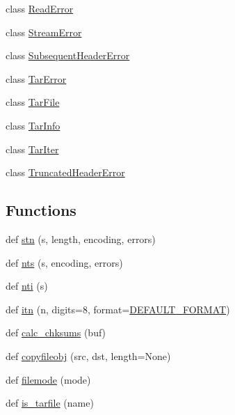 \begin{DoxyCompactItemize}
\item 
class \hyperlink{classpip_1_1__vendor_1_1distlib_1_1__backport_1_1tarfile_1_1ReadError}{Read\+Error}
\item 
class \hyperlink{classpip_1_1__vendor_1_1distlib_1_1__backport_1_1tarfile_1_1StreamError}{Stream\+Error}
\item 
class \hyperlink{classpip_1_1__vendor_1_1distlib_1_1__backport_1_1tarfile_1_1SubsequentHeaderError}{Subsequent\+Header\+Error}
\item 
class \hyperlink{classpip_1_1__vendor_1_1distlib_1_1__backport_1_1tarfile_1_1TarError}{Tar\+Error}
\item 
class \hyperlink{classpip_1_1__vendor_1_1distlib_1_1__backport_1_1tarfile_1_1TarFile}{Tar\+File}
\item 
class \hyperlink{classpip_1_1__vendor_1_1distlib_1_1__backport_1_1tarfile_1_1TarInfo}{Tar\+Info}
\item 
class \hyperlink{classpip_1_1__vendor_1_1distlib_1_1__backport_1_1tarfile_1_1TarIter}{Tar\+Iter}
\item 
class \hyperlink{classpip_1_1__vendor_1_1distlib_1_1__backport_1_1tarfile_1_1TruncatedHeaderError}{Truncated\+Header\+Error}
\end{DoxyCompactItemize}
\subsection*{Functions}
\begin{DoxyCompactItemize}
\item 
def \hyperlink{namespacepip_1_1__vendor_1_1distlib_1_1__backport_1_1tarfile_a5ee6a3494ff244be6017a26391c819d7}{stn} (s, length, encoding, errors)
\item 
def \hyperlink{namespacepip_1_1__vendor_1_1distlib_1_1__backport_1_1tarfile_aafe5be16a10d4249323548895e9e31fb}{nts} (s, encoding, errors)
\item 
def \hyperlink{namespacepip_1_1__vendor_1_1distlib_1_1__backport_1_1tarfile_ab59ffbb62806fd275520cf6fcf85e3b8}{nti} (s)
\item 
def \hyperlink{namespacepip_1_1__vendor_1_1distlib_1_1__backport_1_1tarfile_a14cae059997c819c3a23142671591ecd}{itn} (n, digits=8, format=\hyperlink{namespacepip_1_1__vendor_1_1distlib_1_1__backport_1_1tarfile_a6e93052e6cf6ea79fc8275a58ea1a560}{D\+E\+F\+A\+U\+L\+T\+\_\+\+F\+O\+R\+M\+AT})
\item 
def \hyperlink{namespacepip_1_1__vendor_1_1distlib_1_1__backport_1_1tarfile_af4764bbf43b654ea491f86cfa0a5b906}{calc\+\_\+chksums} (buf)
\item 
def \hyperlink{namespacepip_1_1__vendor_1_1distlib_1_1__backport_1_1tarfile_a312ebc45af40f624a30a0538759d802a}{copyfileobj} (src, dst, length=None)
\item 
def \hyperlink{namespacepip_1_1__vendor_1_1distlib_1_1__backport_1_1tarfile_a4f957fb924e4e21453afd43d4226dcfc}{filemode} (mode)
\item 
def \hyperlink{namespacepip_1_1__vendor_1_1distlib_1_1__backport_1_1tarfile_aca162451b0bf1650bc8ae3e47e08ffae}{is\+\_\+tarfile} (name)
\end{DoxyCompactItemize}
